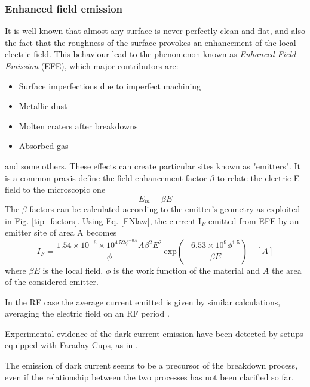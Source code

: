 \subsubsection{Enhanced field emission}

It is well known that almost any surface is never perfectly clean and flat, and also the fact that the roughness of the surface provokes an enhancement of the local electric field. This behaviour lead to the phenomenon known as \textit{Enhanced Field Emission} (EFE), which major contributors are:
\begin{itemize}
\item Surface imperfections due to imperfect machining
\item Metallic dust
\item Molten craters after breakdowns
\item Absorbed gas
\end{itemize} 
and some others. These effects can create particular sites known as "emitters". It is a common praxis define the field enhancement factor $\beta$ to relate the electric E field to the microscopic one
\begin{equation}
E_{m} = \beta E
\end{equation}
The $\beta$ factors can be calculated according to the emitter's geometry \cite{Rohrbach:190223} as exploited in Fig. \ref{tip_factors}.
Using Eq. \ref{FNlaw}, the current I$_F$ emitted from EFE by an emitter site of area A becomes 
\begin{equation}
I_F = \frac{ 1.54\times10^{-6} \times 10^{4.52\phi^{-0.5}} A \beta^2 E^2}{  \phi } \, \text{exp} \left ( -\frac{6.53\times 10^9 \phi^{1.5}}{\beta E} \right ) \quad [A]  \label{If}
\end{equation}
where $\beta E$ is the local field, $\phi$ is the work function of the material and $A$ the area of the considered emitter.

 In the RF case the average current emitted is given by similar calculations, averaging the electric field on an RF period  \cite{Wang:1997ip}. 

Experimental evidence of the dark current emission have been detected by setups equipped with Faraday Cups, as in \cite{Wuensch:advaces}.

The emission of dark current seems to be a precursor of the breakdown  process, even if the relationship between the two processes has not been clarified so far.

